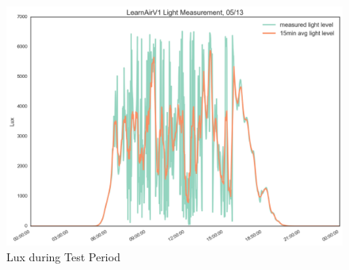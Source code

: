 \begin{figure}[htb]
 	\includegraphics[width=\textwidth]{figs/lux_zoomed}               
 	 \caption{Lux during Test Period}
  	\label{fig:lux_zoomed}
\end{figure}

\clearpage

\FloatBarrier

\enlargethispage{2.5cm}

